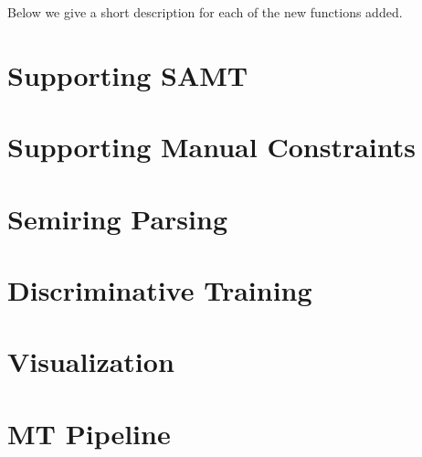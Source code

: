 \documentclass[11pt]{article}
\begin{document}
Below we give a short description for each of the new functions added.


\section{Supporting SAMT}


\section{Supporting Manual Constraints}

\section{Semiring Parsing}

\cite{li-eisner:2009:EMNLP}

\section{Discriminative Training}

\cite{variational-decoding-acl09}
\cite{oracle-extraction-naacl09}

\section{Visualization}

\section{MT Pipeline}



\end{document}
